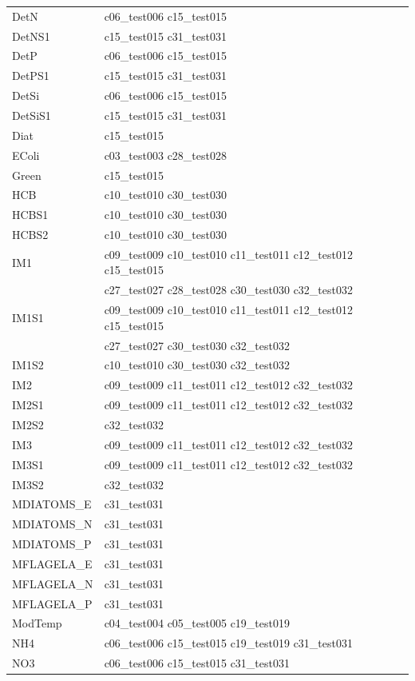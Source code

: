 \begin{longtable}{ll}
DetN & c06\_test006 c15\_test015 \\
DetNS1 & c15\_test015 c31\_test031 \\
DetP & c06\_test006 c15\_test015 \\
DetPS1 & c15\_test015 c31\_test031 \\
DetSi & c06\_test006 c15\_test015 \\
DetSiS1 & c15\_test015 c31\_test031 \\
Diat & c15\_test015 \\
EColi & c03\_test003 c28\_test028 \\
Green & c15\_test015 \\
HCB & c10\_test010 c30\_test030 \\
HCBS1 & c10\_test010 c30\_test030 \\
HCBS2 & c10\_test010 c30\_test030 \\
IM1 & c09\_test009 c10\_test010 c11\_test011 c12\_test012 c15\_test015 \\ 
 & c27\_test027 c28\_test028 c30\_test030 c32\_test032 \\
IM1S1 & c09\_test009 c10\_test010 c11\_test011 c12\_test012 c15\_test015 \\ 
 & c27\_test027 c30\_test030 c32\_test032 \\
IM1S2 & c10\_test010 c30\_test030 c32\_test032 \\
IM2 & c09\_test009 c11\_test011 c12\_test012 c32\_test032 \\
IM2S1 & c09\_test009 c11\_test011 c12\_test012 c32\_test032 \\
IM2S2 & c32\_test032 \\
IM3 & c09\_test009 c11\_test011 c12\_test012 c32\_test032 \\
IM3S1 & c09\_test009 c11\_test011 c12\_test012 c32\_test032 \\
IM3S2 & c32\_test032 \\
MDIATOMS\_E & c31\_test031 \\
MDIATOMS\_N & c31\_test031 \\
MDIATOMS\_P & c31\_test031 \\
MFLAGELA\_E & c31\_test031 \\
MFLAGELA\_N & c31\_test031 \\
MFLAGELA\_P & c31\_test031 \\
ModTemp & c04\_test004 c05\_test005 c19\_test019 \\
NH4 & c06\_test006 c15\_test015 c19\_test019 c31\_test031 \\
NO3 & c06\_test006 c15\_test015 c31\_test031 \\

\end{longtable}
